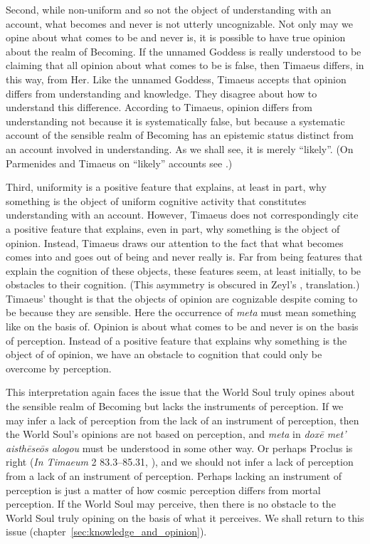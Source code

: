 Second, while non-uniform and so not the object of understanding with an account, what becomes and never is not utterly uncognizable. Not only may we opine about what comes to be and never is, it is possible to have true opinion about the realm of Becoming. If the unnamed Goddess is really understood to be claiming that all opinion about what comes to be is false, then Timaeus differs, in this way, from Her. Like the unnamed Goddess, Timaeus accepts that opinion differs from understanding and knowledge. They disagree about how to understand this difference. According to Timaeus, opinion differs from understanding not because it is systematically false, but because a systematic account of the sensible realm of Becoming has an epistemic status distinct from an account involved in understanding. As we shall see, it is merely ``likely''. (On Parmenides and Timaeus on ``likely'' accounts see \citealt{Bryan:2012bt}.)

Third, uniformity is a positive feature that explains, at least in part, why something is the object of uniform cognitive activity that constitutes understanding with an account. However, Timaeus does not correspondingly cite a positive feature that explains, even in part, why something is the object of opinion. Instead, Timaeus draws our attention to the fact that what becomes comes into and goes out of being and never really is. Far from being features that explain the cognition of these objects, these features seem, at least initially, to be obstacles to their cognition. (This asymmetry is obscured in Zeyl's \citeyear[13]{Zeyl:2000cs}, translation.) Timaeus' thought is that the objects of opinion are cognizable despite coming to be because they are sensible. Here the occurrence of \emph{meta} must mean something like on the basis of. Opinion is about what comes to be and never is on the basis of perception. Instead of a positive feature that explains why something is the object of of opinion, we have an obstacle to cognition that could only be overcome by perception.

This interpretation again faces the issue that the World Soul truly opines about the sensible realm of Becoming but lacks the instruments of perception. If we may infer a lack of perception from the lack of an instrument of perception, then the World Soul's opinions are not based on perception, and \emph{meta} in \emph{doxē met’ aisthēseōs alogou} must be understood in some other way. Or perhaps Proclus is right (\emph{In Timaeum} 2 83.3–85.31, \citealt{Diehl:1903re}), and we should not infer a lack of perception from a lack of an instrument of perception. Perhaps lacking an instrument of perception is just a matter of how cosmic perception differs from mortal perception. If the World Soul may perceive, then there is no obstacle to the World Soul truly opining on the basis of what it perceives. We shall return to this issue (chapter~\ref{sec:knowledge_and_opinion}).

